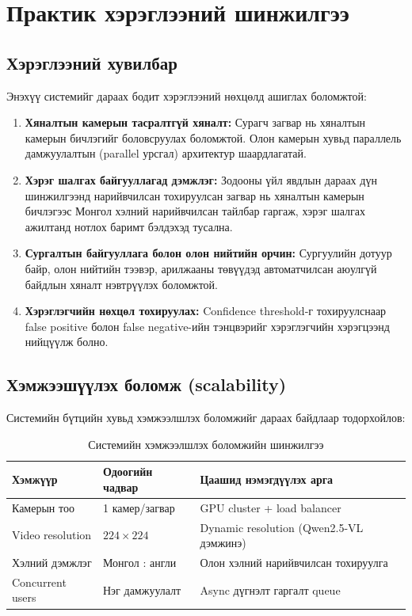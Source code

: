 \section{Практик хэрэглээний шинжилгээ}

\subsection{Хэрэглээний хувилбар}

Энэхүү системийг дараах бодит хэрэглээний нөхцөлд ашиглах боломжтой:

\begin{enumerate}
    \item \textbf{Хяналтын камерын тасралтгүй хяналт:} Сурагч загвар нь хяналтын камерын бичлэгийг боловсруулах боломжтой. Олон камерын хувьд параллель дамжуулалтын (parallel урсгал) архитектур шаардлагатай.

    \item \textbf{Хэрэг шалгах байгууллагад дэмжлэг:} Зодооны үйл явдлын дараах дүн шинжилгээнд нарийвчилсан тохируулсан загвар нь хяналтын камерын бичлэгээс Монгол хэлний нарийвчилсан тайлбар гаргаж, хэрэг шалгах ажилтанд нотлох баримт бэлдэхэд тусална.

    \item \textbf{Сургалтын байгууллага болон олон нийтийн орчин:} Сургуулийн дотуур байр, олон нийтийн тээвэр, арилжааны төвүүдэд автоматчилсан аюулгүй байдлын хяналт нэвтрүүлэх боломжтой.

    \item \textbf{Хэрэглэгчийн нөхцөл тохируулах:} Confidence threshold-г тохируулснаар false positive болон false negative-ийн тэнцвэрийг хэрэглэгчийн хэрэгцээнд нийцүүлж болно.
\end{enumerate}

\subsection{Хэмжээшүүлэх боломж (scalability)}

Системийн бүтцийн хувьд хэмжээлшлэх боломжийг дараах байдлаар тодорхойлов:

\begin{table}[htbp]
\centering
\caption{Системийн хэмжээлшлэх боломжийн шинжилгээ}
\label{tab:scalability}
\begin{tabular}{p{3.5cm}p{3.5cm}p{4.5cm}}
\hline
\textbf{Хэмжүүр} & \textbf{Одоогийн чадвар} & \textbf{Цаашид нэмэгдүүлэх арга} \\
\hline
Камерын тоо           & 1 камер/загвар       & GPU cluster + load balancer \\
Video resolution      & $224 \times 224$     & Dynamic resolution (Qwen2.5-VL дэмжинэ) \\
Хэлний дэмжлэг        & Монгол : англи       & Олон хэлний нарийвчилсан тохируулга \\
Concurrent users      & Нэг дамжуулалт       & Async дүгнэлт гаргалт queue \\
\hline
\end{tabular}
\end{table}

